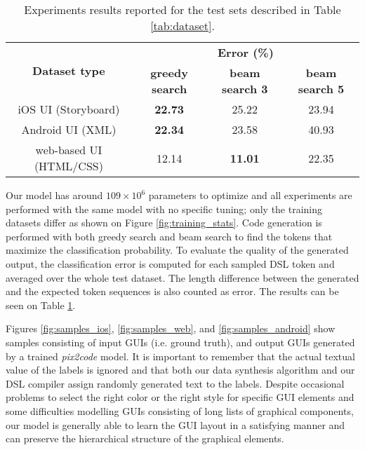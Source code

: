 \documentclass{article}
\begin{document}
\begin{table}[H]
    \caption{Experiments results reported for the test sets described in Table \ref{tab:dataset}.}
    \centering
    \begin{tabular}{| c | c | c | c |} \hline
        \multirow{2}{*}{\textbf{Dataset type}} &
        \multicolumn{3}{c|}{\textbf{Error (\%)}} \\ \cline{2-4}
        & \textbf{greedy search} & \textbf{beam search 3} & \textbf{beam search 5}\\ \hline
        iOS UI (Storyboard) & \textbf{22.73} & 25.22 & 23.94 \\ \hline
        Android UI (XML) & \textbf{22.34} & 23.58 & 40.93 \\ \hline
        web-based UI (HTML/CSS) & 12.14 & \textbf{11.01} & 22.35 \\ \hline
    \end{tabular}
    \label{tab:experiments}
\end{table}

Our model has around $109 \times 10^6$ parameters to optimize and all experiments are performed with the same model with no specific tuning; only the training datasets differ as shown on Figure \ref{fig:training_stats}. Code generation is performed with both greedy search and beam search to find the tokens that maximize the classification probability. To evaluate the quality of the generated output, the classification error is computed for each sampled DSL token and averaged over the whole test dataset. The length difference between the generated and the expected token sequences is also counted as error. The results can be seen on Table \ref{tab:experiments}.

Figures \ref{fig:samples_ios}, \ref{fig:samples_web}, and \ref{fig:samples_android} show samples consisting of input GUIs (i.e. ground truth), and output GUIs generated by a trained \emph{pix2code} model. It is important to remember that the actual textual value of the labels is ignored and that both our data synthesis algorithm and our DSL compiler assign randomly generated text to the labels. Despite occasional problems to select the right color or the right style for specific GUI elements and some difficulties modelling GUIs consisting of long lists of graphical components, our model is generally able to learn the GUI layout in a satisfying manner and can preserve the hierarchical structure of the graphical elements.
\end{document}
